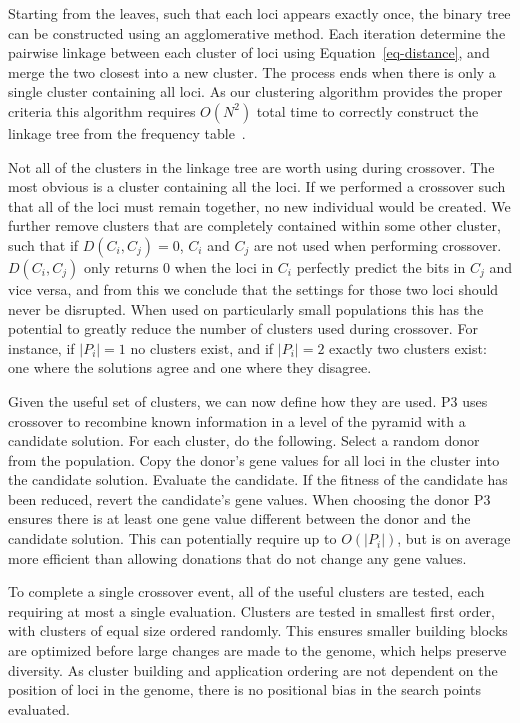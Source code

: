 \documentclass{sig-alternate}
\begin{document}
Starting from the leaves, such that each loci appears exactly once, the binary tree
can be constructed using an agglomerative method.  Each iteration determine the
pairwise linkage between each cluster of loci using Equation~\ref{eq-distance},
and merge the two closest into a new cluster.  The process ends when there is only
a single cluster containing all loci.  As our clustering algorithm provides the proper
criteria this algorithm requires $O(N^2)$ total time to correctly construct the linkage tree
from the frequency table~\cite{gronau:2007:upgma}.

Not all of the clusters in the linkage tree are worth using during crossover.  The most
obvious is a cluster containing all the loci.  If we performed a crossover such that all
of the loci must remain together, no new individual would be created.  We further remove
clusters that are completely contained within some other cluster, such that if
$D(C_i,C_j) = 0$, $C_i$ and $C_j$ are not used when performing crossover.  $D(C_i,C_j)$ only
returns $0$ when the loci in $C_i$ perfectly predict the bits in $C_j$ and vice versa,
and from this we conclude that the settings for those two loci should never be disrupted.
When used on particularly small populations this has the potential to greatly reduce the number
of clusters used during crossover.  For instance, if $|P_i| = 1$ no clusters exist, and if $|P_i| = 2$
exactly two clusters exist: one where the solutions agree and one where they disagree.

Given the useful set of clusters, we can now define how they are used.  P3 uses
crossover to recombine known information in a level of the pyramid with a candidate
solution.  For each cluster, do the following.  Select a random donor from the population.
Copy the donor's gene values for all loci in the cluster into the candidate solution.
Evaluate the candidate.  If the fitness of the candidate has been reduced, revert the candidate's
gene values.  When choosing the donor P3 ensures there is at least one gene value
different between the donor and the candidate solution.  This can potentially require
up to $O(|P_i|)$, but is on average more efficient than allowing donations that
do not change any gene values.

To complete a single crossover event, all of the useful clusters are tested, each
requiring at most a single evaluation.  Clusters are tested in smallest first order,
with clusters of equal size ordered randomly.  This ensures smaller building blocks
are optimized before large changes are made to the genome, which helps preserve
diversity.  As cluster building and application ordering are not dependent on
the position of loci in the genome, there is no positional bias in the search points
evaluated.
\end{document}
